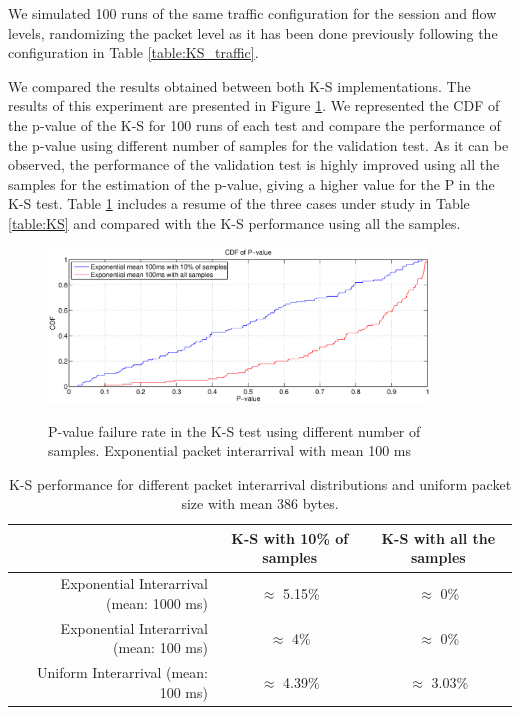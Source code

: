 We simulated 100 runs of the same traffic configuration for the session and flow levels, randomizing the packet level as it has been done previously following the configuration in Table \ref{table:KS_traffic}.

We compared the results obtained between both \acs{K-S} implementations. The results of this experiment are presented in Figure \ref{fig:ks_optimization}. We represented the CDF of the p-value of the \acs{K-S} for 100 runs of each test and compare the performance of the p-value using different number of samples for the validation test. As it can be observed, the performance of the validation test is highly improved using all the samples for the estimation of the p-value, giving a higher value for the P in the \acs{K-S} test. Table \ref{table:KS_optimized} includes a resume of the three cases under study in Table \ref{table:KS} and compared with the \acs{K-S} performance using all the samples.

\begin{figure}[h!]
	\centering
		\includegraphics[width=0.9\textwidth, trim = 0mm 0mm 0mm 0mm, clip]{images/results/GlobalView/KS/ks_optimization/pvalue_exponential100ms}
		\label{fig:ks_optimization_exp100}
	\caption{P-value failure rate in the \acs{K-S} test using different number of samples. Exponential packet interarrival with mean 100 ms}
	\label{fig:ks_optimization}
\end{figure}

\begin{table}[h!]
	\centering
	\begin{tabular}{ r | c | c }
		& \acs{K-S} with 10\% of samples & \acs{K-S} with all the samples \\ \hline
		Exponential Interarrival (mean: 1000 ms) & $\approx$ 5.15\% & $\approx$ 0\% \\ 
		Exponential Interarrival (mean: 100 ms) & $\approx$ 4\% & $\approx$ 0\% \\ 
		Uniform Interarrival (mean: 100 ms) & $\approx$ 4.39\% & $\approx$ 3.03\% \\ 
	\end{tabular}
	\caption{\acs{K-S} performance for different packet interarrival distributions and uniform packet size with mean 386 bytes.}
	\label{table:KS_optimized}
\end{table}

